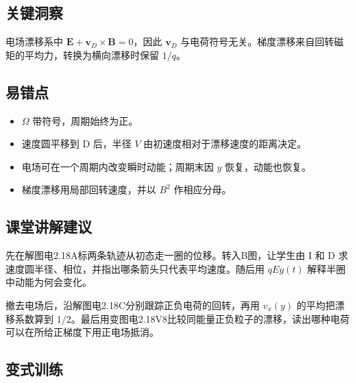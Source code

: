 \documentclass[UTF8,fontset=fandol,a4paper,11pt]{ctexart}
\newcommand{\vect}[1]{\bm{#1}}
\begin{document}


\subsection*{关键洞察}

电场漂移系中 $\vect E+\vect v_D\times\vect B=0$，因此 $\vect v_D$ 与电荷符号无关。梯度漂移来自回转磁矩的平均力，转换为横向漂移时保留 $1/q$。



\subsection*{易错点}

\begin{itemize}
\item $\Omega$ 带符号，周期始终为正。
\item 速度圆平移到 D 后，半径 $V$ 由初速度相对于漂移速度的距离决定。
\item 电场可在一个周期内改变瞬时动能；周期末因 $y$ 恢复，动能也恢复。
\item 梯度漂移用局部回转速度，并以 $B^2$ 作相应分母。
\end{itemize}



\subsection*{课堂讲解建议}

先在解图电2.18A标两条轨迹从初态走一圈的位移。转入B图，让学生由 I 和 D 求速度圆半径、相位，并指出哪条箭头只代表平均速度。随后用 $qEy(t)$ 解释半圈中动能为何会变化。

撤去电场后，沿解图电2.18C分别跟踪正负电荷的回转，再用 $v_x(y)$ 的平均把漂移系数算到 $1/2$。最后用变图电2.18V8比较同能量正负粒子的漂移，读出哪种电荷可以在所给正梯度下用正电场抵消。


\subsection*{变式训练}
\end{document}
